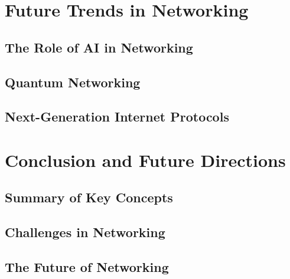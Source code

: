 \documentclass{book}
\begin{document}
\chapter{Future Trends in Networking}
    \section{The Role of AI in Networking}
    \section{Quantum Networking}
    \section{Next-Generation Internet Protocols}
    
\chapter{Conclusion and Future Directions}
    \section{Summary of Key Concepts}
    \section{Challenges in Networking}
    \section{The Future of Networking}
    
\end{document}
